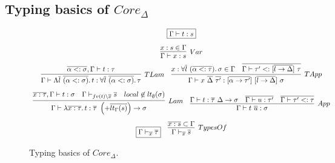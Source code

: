 \documentclass[11pt]{article}
\newcommand{\mathframebox}[1]{\framebox{$\displaystyle #1$}}
\newcommand{\ap}{~}
\begin{document}
    \subsection{Typing basics of $Core_\Delta$}

    \begin{figure}
        \begin{gather*}
            \mathframebox{\Gamma\vdash t : s} \\[0.5em]
            \infer[Var]{\Gamma\vdash x : s}{x : s \in \Gamma} \\
            \begin{array}{cc}
                \infer[TLam]{
                    \Gamma\vdash\Lambda\overline{l}\ap\overline{(\alpha <: \sigma)}\ldotp t : \forall\overline{l}\ap\overline{(\alpha <: \sigma)}\ldotp\tau
                }{
                    \overline{\alpha <: \sigma}, \Gamma\vdash t : \tau
                } &
                \infer[TApp]{
                    \Gamma\vdash x\ap\overline{\Delta}\ap\overline{\tau'} : [\overline{\alpha\to\tau'}]\ap[\overline{l\to\Delta}]\ap\sigma
                }{
                    x : \forall\overline{l}\ap(\overline{\alpha <: \tau})\ldotp \sigma \in \Gamma
                    &
                    \overline{\Gamma\vdash\tau' <: [\overline{l\to\Delta}]\ap\tau}
                }
            \end{array} \\[0.5em]
            \begin{array}{cc}
                \infer[Lam]{
                    \Gamma\vdash \lambda \overline{x : \tau} \ldotp t :  \overline{\tau}~ \left(+\overline{lt_\Gamma(s)}\right) \to \sigma
                }{
                    \overline{x : \tau}, \Gamma\vdash t : \sigma
                    &
                    \Gamma\vdash_{fv(t)\setminus \overline{x}}\overline{s}
                    &
                    local \not\in lt_\emptyset(\sigma)
                } &
                \infer[App]{
                    \Gamma\vdash t \ap \overline{u} : \sigma
                } {
                    \Gamma\vdash t : \overline{\tau}~\Delta\to\sigma
                    &
                    \overline{\Gamma\vdash u : \tau'}
                    &
                    \overline{\Gamma\vdash\tau' <: \tau}
                }
            \end{array} \\[0.5em]
            \begin{array}{cc}
                \mathframebox{\Gamma\vdash_{\overline{x}}\overline{\tau}} &
                \infer[TypesOf]{\Gamma\vdash_{\overline{x}}\overline{s}}{\overline{x : s} \subset \Gamma}
            \end{array}
        \end{gather*}
        \caption{Typing basics of $Core_\Delta$.}
        \label{fig:core-functions}
    \end{figure}
\end{document}
